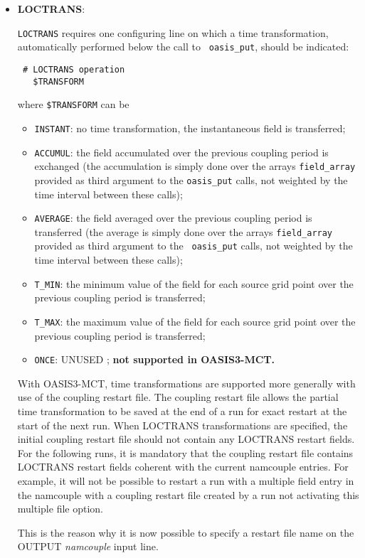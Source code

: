 \begin{itemize}

\item {\bf LOCTRANS}:

  {\tt LOCTRANS} requires one configuring line on which a time
  transformation, automatically performed below the call to {\tt
    oasis\_put}, should be indicated:

  \begin{verbatim}
 # LOCTRANS operation
   $TRANSFORM
\end{verbatim}
  \vspace{-0.2cm} where {\tt \$TRANSFORM} can be
  \begin{itemize}
  \item {\tt INSTANT}: no time transformation, the instantaneous field
    is transferred;
  \item {\tt ACCUMUL}: the field accumulated over the previous
    coupling period is exchanged (the accumulation is simply done over
    the arrays {\tt field\_array} provided as third argument to the
    {\tt oasis\_put} calls, not weighted by the time interval between
    these calls);
  \item {\tt AVERAGE}: the field averaged over the previous coupling
    period is transferred (the average is simply done over the arrays
    {\tt field\_array} provided as third argument to the {\tt
      oasis\_put} calls, not weighted by the time interval between
    these calls);
  \item {\tt T\_MIN}: the minimum value of the field for each source
    grid point over the previous coupling period is transferred;
  \item {\tt T\_MAX}: the maximum value of the field for each source
    grid point over the previous coupling period is transferred;
  \item {\tt ONCE}: UNUSED ; {\bf not supported in OASIS3-MCT.}
  \end{itemize}

  With OASIS3-MCT, time transformations are supported more generally
  with use of the coupling restart file.  The coupling restart file
  allows the partial time transformation to be saved at the end of a
  run for exact restart at the start of the next run. When LOCTRANS 
  transformations are specified, the initial coupling restart file
  should not contain any LOCTRANS restart fields. For the following
  runs, it is mandatory that the coupling restart file contains
  LOCTRANS restart fields coherent with the current namcouple
  entries. For example, it will not be possible to restart a run with
  a multiple field entry in the namcouple with a coupling restart file 
  created by a run not activating this multiple file option.

  This is
  the reason why it is now possible to specify a restart file name
  on the OUTPUT {\it namcouple} input line.

\end{itemize}

